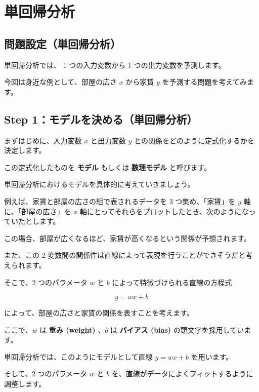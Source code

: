 \section{単回帰分析}


\subsection{問題設定（単回帰分析）}


単回帰分析では、 1 つの入力変数から 1 つの出力変数を予測します。

今回は身近な例として、部屋の広さ $x$ から家賃 $y$ を予測する問題を考えてみます。


\subsection{Step 1：モデルを決める（単回帰分析）}


まずはじめに、入力変数 $x$ と出力変数 $y$ との関係をどのように定式化するかを決定します。

この定式化したものを \textbf{モデル} もしくは \textbf{数理モデル} と呼びます。


単回帰分析におけるモデルを具体的に考えていきましょう。

例えば、家賃と部屋の広さの組で表されるデータを 3 つ集め、「家賃」を  $y$ 軸に、「部屋の広さ」を  $x$ 軸にとってそれらをプロットしたとき、次のようになっていたとします。




この場合、部屋が広くなるほど、家賃が高くなるという関係が予想されます。

また、この 2 変数間の関係性は直線によって表現を行うことができそうだと考えられます。

そこで、2 つのパラメータ $w$ と $b$ によって特徴づけられる直線の方程式


\[
y = wx + b
\]


によって、部屋の広さと家賃の関係を表すことを考えます。

ここで、$w$ は \textbf{重み (weight)} 、$b$ は \textbf{バイアス (bias)} の頭文字を採用しています。




単回帰分析では、このようにモデルとして直線 $y = wx + b$ を用います。

そして、2 つのパラメータ $w$ と $b$ を、直線がデータによくフィットするように調整します。


